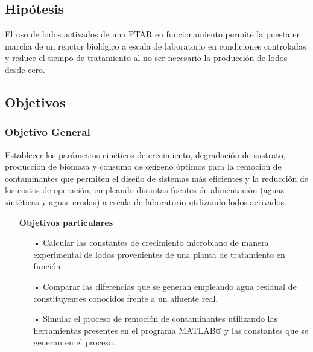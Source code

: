 \subsection*{Hipótesis}
El uso de lodos activados de una PTAR en funcionamiento permite la puesta en marcha de un reactor biológico a escala de laboratorio en condiciones controladas y reduce el tiempo de tratamiento al no ser necesario la producción de lodos desde cero.
\subsection*{Objetivos}
\subsubsection*{Objetivo General}
Establecer los parámetros cinéticos de crecimiento, degradación de sustrato, producción de biomasa y consumo de oxígeno óptimos para la remoción de contaminantes que permiten el diseño de sistemas más eficientes y la reducción de los costos de operación, empleando distintas fuentes de alimentación (aguas sintéticas y aguas crudas) a escala de laboratorio utilizando lodos activados.
	\begin{itemize}
		\item[] \textbf{Objetivos particulares}
			\begin{itemize}
				\item[•] Calcular las constantes de crecimiento microbiano de manera experimental de lodos provenientes de una planta de tratamiento en función
				\item[•] Comparar las diferencias que se generan empleando agua residual de constituyentes conocidos frente a un afluente real.
				\item[•]	Simular el proceso de remoción de contaminantes utilizando las herramientas presentes en el programa MATLAB® y las constantes que se generan en el proceso.
			\end{itemize}
	\end{itemize}
